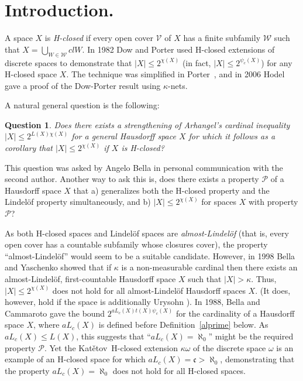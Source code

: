 \documentclass[11pt]{amsart}
\newtheorem{question}[theorem]{Question}
\theoremstyle{definition}
\theoremstyle{remark}
\numberwithin{equation}{section}
\begin{document}
\section{Introduction.}
A space $X$ is \emph{H-closed} if every open cover ${\ensuremath{\mathcal{{V}}}}$ of $X$ has a finite subfamily ${\ensuremath{\mathcal{{W}}}}$ such that $X={\bigcup}_{W\in{\ensuremath{\mathcal{{W}}}}}clW$. In 1982 Dow and Porter \cite{DowPorter82} used H-closed extensions of discrete spaces to demonstrate that $|X|\leq 2^{\chi(X)}$ (in fact, $|X|\leq 2^{\psi_c(X)}$) for any H-closed space $X$. The technique was simplified in Porter~\cite{por93}, and in 2006 Hodel~\cite{Hodel2006} gave a proof of the Dow-Porter result using $\kappa$-nets. 

A natural general question is the following:

\begin{question} Does there exists a strengthening of {Arhangel\cprimeski{\u\i}}'s cardinal inequality $|X|\leq 2^{L(X)\chi(X)}$ \cite{arh1969} for a general Hausdorff space $X$ for which it follows as a corollary that $|X|\leq 2^{\chi(X)}$ if $X$ is H-closed?
\end{question}

This question was asked by Angelo Bella in personal communication with the second author. Another way to ask this is, does there exists a property ${\ensuremath{\mathcal{{P}}}}$ of a Hausdorff space $X$ that a) generalizes both the H-closed property and the Lindel\"of property simultaneously, and b) $|X|\leq 2^{\chi(X)}$ for spaces $X$ with property ${\ensuremath{\mathcal{{P}}}}$?

As both H-closed spaces and Lindel\"of spaces are \emph{almost-Lindel\"of} (that is, every open cover has a countable subfamily whose closures cover), the property ``almost-Lindel\"of'' would seem to be a suitable candidate. However, in 1998 Bella and Yaschenko \cite{bey1998} showed that if $\kappa$ is a non-measurable cardinal then there exists an almost-Lindel\"of, first-countable Hausdorff space $X$ such that $|X|>\kappa$. Thus, $|X|\leq 2^{\chi(X)}$ does not hold for all almost-Lindel\"of Hausdorff spaces $X$. (It does, however, hold if the space is additionally Urysohn \cite{BellaCammaroto1988}). In 1988, Bella and Cammaroto \cite{BellaCammaroto1988} gave the bound $2^{aL_c(X)t(X)\psi_c(X)}$ for the cardinality of a Hausdorff space $X$, where $aL_c(X)$ is defined before Definition~\ref{alprime} below. As $aL_c(X)\leq L(X)$, this suggests that ``$aL_c(X)=\aleph_0$'' might be the required property ${\ensuremath{\mathcal{{P}}}}$. Yet the {Kat\v{e}tov}~H-closed extension $\kappa\omega$ of the discrete space $\omega$ is an example of an H-closed space for which $aL_c(X)=\mathfrak{c}>\aleph_0$, demonstrating that the property $aL_c(X)=\aleph_0$ does not hold for all H-closed spaces.
\end{document}
